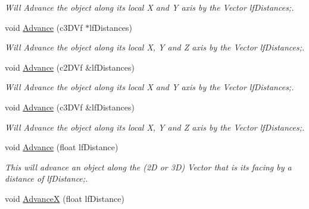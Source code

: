 \begin{DoxyCompactItemize}
\begin{DoxyCompactList}\small\item\em Will Advance the object along its local X and Y axis by the Vector lfDistances;. \end{DoxyCompactList}\item 
\hypertarget{classc_matrix4_a86aefa3a444eaabd4ad1a66e4857f40e}{
void \hyperlink{classc_matrix4_a86aefa3a444eaabd4ad1a66e4857f40e}{Advance} (c3DVf $\ast$lfDistances)}
\label{classc_matrix4_a86aefa3a444eaabd4ad1a66e4857f40e}

\begin{DoxyCompactList}\small\item\em Will Advance the object along its local X, Y and Z axis by the Vector lfDistances;. \end{DoxyCompactList}\item 
\hypertarget{classc_matrix4_a07d410e6592dacf244ad118d70443181}{
void \hyperlink{classc_matrix4_a07d410e6592dacf244ad118d70443181}{Advance} (c2DVf \&lfDistances)}
\label{classc_matrix4_a07d410e6592dacf244ad118d70443181}

\begin{DoxyCompactList}\small\item\em Will Advance the object along its local X and Y axis by the Vector lfDistances;. \end{DoxyCompactList}\item 
\hypertarget{classc_matrix4_ac07dd71793d6df522efa2098f9e1daa6}{
void \hyperlink{classc_matrix4_ac07dd71793d6df522efa2098f9e1daa6}{Advance} (c3DVf \&lfDistances)}
\label{classc_matrix4_ac07dd71793d6df522efa2098f9e1daa6}

\begin{DoxyCompactList}\small\item\em Will Advance the object along its local X, Y and Z axis by the Vector lfDistances;. \end{DoxyCompactList}\item 
\hypertarget{classc_matrix4_ad0744229e75d1053c3a2e4bcfe8dc46f}{
void \hyperlink{classc_matrix4_ad0744229e75d1053c3a2e4bcfe8dc46f}{Advance} (float lfDistance)}
\label{classc_matrix4_ad0744229e75d1053c3a2e4bcfe8dc46f}

\begin{DoxyCompactList}\small\item\em This will advance an object along the (2D or 3D) Vector that is its facing by a distance of lfDistance;. \end{DoxyCompactList}\item 
\hypertarget{classc_matrix4_aa23f7d55e4eddcba673f8a6e44f63c3e}{
void \hyperlink{classc_matrix4_aa23f7d55e4eddcba673f8a6e44f63c3e}{AdvanceX} (float lfDistance)}
\label{classc_matrix4_aa23f7d55e4eddcba673f8a6e44f63c3e}


\end{DoxyCompactItemize}
